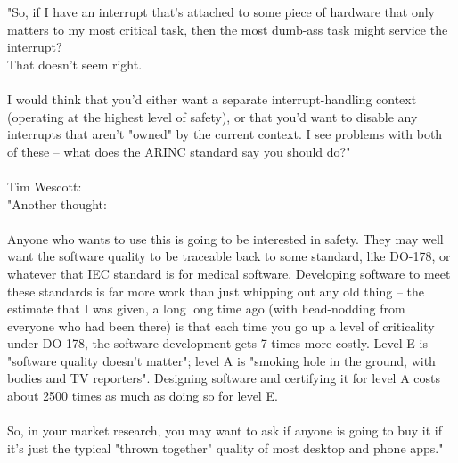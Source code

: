 "So, if I have an interrupt that's attached to some piece of hardware that only matters to my most 
critical task, then the most dumb-ass task might service the interrupt?\\
That doesn't seem right.\\
\\

I would think that you'd either want a separate interrupt-handling context (operating at the highest level 
of safety), or that you'd want to disable any interrupts that aren't "owned" by the current context.  I 
see problems with both of these -- what does the ARINC standard say you should do?"\\
\\
Tim Wescott:\\
"Another thought:\\
\\

Anyone who wants to use this is going to be interested in safety.  They may well want the software quality 
to be traceable back to some standard, like DO-178, or whatever that IEC standard is for medical software.  
Developing software to meet these standards is far more work than just whipping out any old thing -- the 
estimate that I was given, a long long time ago (with head-nodding from everyone who had been there) is 
that each time you go up a level of criticality under DO-178, the software development gets 7 times more 
costly.  Level E is "software quality doesn't matter"; level A is "smoking hole in the ground, with bodies 
and TV reporters".  Designing software and certifying it for level A costs about 2500 times as much as 
doing so for level E.\\
\\

So, in your market research, you may want to ask if anyone is going to buy it if it's just the typical "thrown together" quality of most desktop and phone apps."\\
